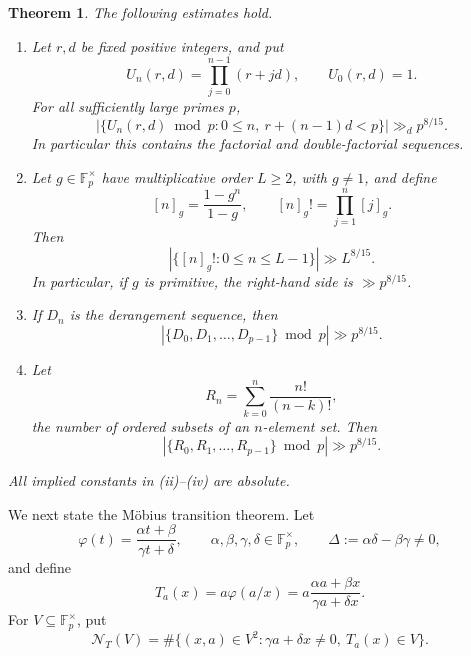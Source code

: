 \documentclass[11pt,reqno]{amsart}
\numberwithin{equation}{section}
\newtheorem{theorem}{Theorem}[section]
\theoremstyle{definition}
\theoremstyle{remark}
\newcommand{\F}{\mathbb F}
\newcommand{\cN}{\mathcal N}
\begin{document}
\begin{theorem}\label{thm:affine-applications-intro}
The following estimates hold.
\begin{enumerate}[label=(\roman*)]
  \item Let $r,d$ be fixed positive integers, and put
  \[
    U_n(r,d)=\prod_{j=0}^{n-1}(r+jd),
    \qquad U_0(r,d)=1.
  \]
  For all sufficiently large primes $p$,
  \[
    \left|\{U_n(r,d)\bmod p:0\le n,\ r+(n-1)d<p\}\right|
    \gg_d p^{8/15}.
  \]
  In particular this contains the factorial and double-factorial sequences.

  \item Let $g\in\F_p^\times$ have multiplicative order $L\ge2$, with $g\ne1$, and define
  \[
    [n]_g=\frac{1-g^n}{1-g},
    \qquad
    [n]_g!=\prod_{j=1}^n[j]_g.
  \]
  Then
  \begin{equation}\label{eq:qfactorial-intro}
    \left|\{[n]_g!:0\le n\le L-1\}\right|\gg L^{8/15}.
  \end{equation}
  In particular, if $g$ is primitive, the right-hand side is $\gg p^{8/15}$.

  \item If $D_n$ is the derangement sequence, then
  \begin{equation}\label{eq:derangement-intro}
    \left|\{D_0,D_1,\ldots,D_{p-1}\}\bmod p\right|\gg p^{8/15}.
  \end{equation}

  \item Let
  \[
    R_n=\sum_{k=0}^n\frac{n!}{(n-k)!},
  \]
  the number of ordered subsets of an $n$-element set.  Then
  \begin{equation}\label{eq:arrangement-intro}
    \left|\{R_0,R_1,\ldots,R_{p-1}\}\bmod p\right|\gg p^{8/15}.
  \end{equation}
\end{enumerate}
All implied constants in (ii)--(iv) are absolute.
\end{theorem}

We next state the M\"obius transition theorem.  Let
\begin{equation}\label{eq:phi-intro}
  \varphi(t)=\frac{\alpha t+\beta}{\gamma t+\delta},
  \qquad
  \alpha,\beta,\gamma,\delta\in\F_p^\times,
  \qquad
  \Delta:=\alpha\delta-\beta\gamma\ne0,
\end{equation}
and define
\begin{equation}\label{eq:T-intro}
  T_a(x)=a\varphi(a/x)
  =a\frac{\alpha a+\beta x}{\gamma a+\delta x}.
\end{equation}
For $V\subseteq\F_p^\times$, put
\begin{equation}\label{eq:transition-count-intro}
  \cN_T(V)
  =\#\{(x,a)\in V^2:\gamma a+\delta x\ne0,\ T_a(x)\in V\}.
\end{equation}
\end{document}
